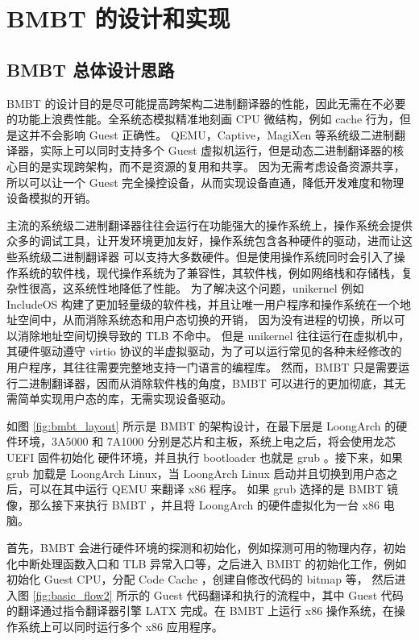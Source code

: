 \chapter{BMBT 的设计和实现}\label{chap:bmbt}

\section{BMBT 总体设计思路}
BMBT 的设计目的是尽可能提高跨架构二进制翻译器的性能，因此无需在不必要的功能上浪费性能。全系统态模拟精准地刻画 CPU 微结构，例如 cache 行为，但是这并不会影响 Guest 正确性。
QEMU，Captive，MagiXen 等系统级二进制翻译器，实际上可以同时支持多个 Guest 虚拟机运行，但是动态二进制翻译器的核心目的是实现跨架构，而不是资源的复用和共享。
因为无需考虑设备资源共享，所以可以让一个 Guest 完全操控设备，从而实现设备直通，降低开发难度和物理设备模拟的开销。

主流的系统级二进制翻译器往往会运行在功能强大的操作系统上，操作系统会提供众多的调试工具，让开发环境更加友好，操作系统包含各种硬件的驱动，进而让这些系统级二进制翻译器
可以支持大多数硬件。但是使用操作系统同时会引入了操作系统的软件栈，现代操作系统为了兼容性，其软件栈，例如网络栈和存储栈，复杂性很高，这系统性地降低了性能。
为了解决这个问题，unikernel 例如 IncludeOS \citep{bratterud2015includeos} 构建了更加轻量级的软件栈，并且让唯一用户程序和操作系统在一个地址空间中，从而消除系统态和用户态切换的开销，
因为没有进程的切换，所以可以消除地址空间切换导致的 TLB 不命中。
但是 unikernel 往往运行在虚拟机中，其硬件驱动遵守 virtio 协议的半虚拟驱动，为了可以运行常见的各种未经修改的用户程序，其往往需要完整地支持一门语言的编程库。
然而，BMBT 只是需要运行二进制翻译器，因而从消除软件栈的角度，BMBT 可以进行的更加彻底，其无需简单实现用户态的库，无需实现设备驱动。

如图 \ref{fig:bmbt_layout} 所示是 BMBT 的架构设计，在最下层是 LoongArch 的硬件环境，3A5000 和 7A1000 分别是芯片和主板，系统上电之后，将会使用龙芯 UEFI 固件初始化
硬件环境，并且执行 bootloader 也就是 grub 。接下来，如果 grub 加载是 LoongArch Linux，当 LoongArch Linux 启动并且切换到用户态之后，可以在其中运行 QEMU 来翻译 x86 程序。
如果 grub 选择的是 BMBT 镜像，那么接下来执行 BMBT ，并且将 LoongArch 的硬件虚拟化为一台 x86 电脑。

首先，BMBT 会进行硬件环境的探测和初始化，例如探测可用的物理内存，初始化中断处理函数入口和 TLB 异常入口等，之后进入 BMBT 的初始化工作，例如初始化 Guest CPU，分配 Code Cache ，创建自修改代码的 bitmap 等，
然后进入图 \ref{fig:basic_flow2} 所示的 Guest 代码翻译和执行的流程中，其中 Guest 代码的翻译通过指令翻译器引擎 LATX 完成。在 BMBT 上运行 x86 操作系统，在操作系统上可以同时运行多个 x86 应用程序。

